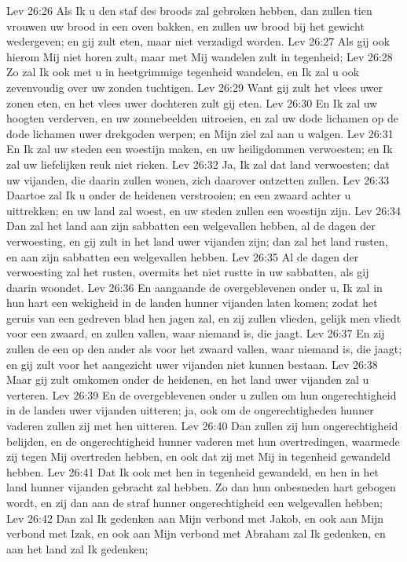 Lev 26:26  Als Ik u den staf des broods zal gebroken hebben, dan zullen tien vrouwen uw brood in een oven bakken, en zullen uw brood bij het gewicht wedergeven; en gij zult eten, maar niet verzadigd worden.
Lev 26:27  Als gij ook hierom Mij niet horen zult, maar met Mij wandelen zult in tegenheid;
Lev 26:28  Zo zal Ik ook met u in heetgrimmige tegenheid wandelen, en Ik zal u ook zevenvoudig over uw zonden tuchtigen.
Lev 26:29  Want gij zult het vlees uwer zonen eten, en het vlees uwer dochteren zult gij eten.
Lev 26:30  En Ik zal uw hoogten verderven, en uw zonnebeelden uitroeien, en zal uw dode lichamen op de dode lichamen uwer drekgoden werpen; en Mijn ziel zal aan u walgen.
Lev 26:31  En Ik zal uw steden een woestijn maken, en uw heiligdommen verwoesten; en Ik zal uw liefelijken reuk niet rieken.
Lev 26:32  Ja, Ik zal dat land verwoesten; dat uw vijanden, die daarin zullen wonen, zich daarover ontzetten zullen.
Lev 26:33  Daartoe zal Ik u onder de heidenen verstrooien; en een zwaard achter u uittrekken; en uw land zal woest, en uw steden zullen een woestijn zijn.
Lev 26:34  Dan zal het land aan zijn sabbatten een welgevallen hebben, al de dagen der verwoesting, en gij zult in het land uwer vijanden zijn; dan zal het land rusten, en aan zijn sabbatten een welgevallen hebben.
Lev 26:35  Al de dagen der verwoesting zal het rusten, overmits het niet rustte in uw sabbatten, als gij daarin woondet.
Lev 26:36  En aangaande de overgeblevenen onder u, Ik zal in hun hart een wekigheid in de landen hunner vijanden laten komen; zodat het geruis van een gedreven blad hen jagen zal, en zij zullen vlieden, gelijk men vliedt voor een zwaard, en zullen vallen, waar niemand is, die jaagt.
Lev 26:37  En zij zullen de een op den ander als voor het zwaard vallen, waar niemand is, die jaagt; en gij zult voor het aangezicht uwer vijanden niet kunnen bestaan.
Lev 26:38  Maar gij zult omkomen onder de heidenen, en het land uwer vijanden zal u verteren.
Lev 26:39  En de overgeblevenen onder u zullen om hun ongerechtigheid in de landen uwer vijanden uitteren; ja, ook om de ongerechtigheden hunner vaderen zullen zij met hen uitteren.
Lev 26:40  Dan zullen zij hun ongerechtigheid belijden, en de ongerechtigheid hunner vaderen met hun overtredingen, waarmede zij tegen Mij overtreden hebben, en ook dat zij met Mij in tegenheid gewandeld hebben.
Lev 26:41  Dat Ik ook met hen in tegenheid gewandeld, en hen in het land hunner vijanden gebracht zal hebben. Zo dan hun onbesneden hart gebogen wordt, en zij dan aan de straf hunner ongerechtigheid een welgevallen hebben;
Lev 26:42  Dan zal Ik gedenken aan Mijn verbond met Jakob, en ook aan Mijn verbond met Izak, en ook aan Mijn verbond met Abraham zal Ik gedenken, en aan het land zal Ik gedenken;
